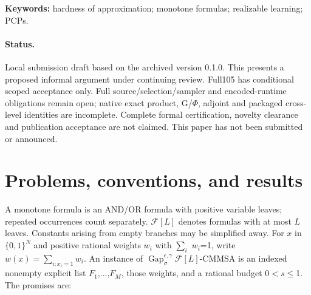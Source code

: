 \begin{abstract}
For every sufficiently large fixed leaf bound \(L\), we present a proposed randomized polynomial-time many-one NP-hardness of realizable Collection Minimum Monotone Satisfying Assignment with weight gap \(L^{1-o(1)}\) and NO satisfaction threshold \(o(1)\). The corresponding bounded-advice learning statement follows through Hirahara--Nanashima's transfer. The target is the \(\epsilon\)=0 strengthening asked in Section 7 of their June 23, 2026 revision. We combine their star-projection compilation with Minzer--Zheng's Grassmann PCP machinery, an altered repetition parameter order, explicit advice-posterior and zoom-out estimates, a maximal-extension threshold ladder, and finite-list completeness repair. Every leaf/advice bound is fixed independently of input length; the polynomial exponent may depend on it. The contribution is the nearlinear exponent in the realizable regime, with earlier realizable hardness explicitly credited below.

\end{abstract}
\noindent\textbf{Keywords:} hardness of approximation; monotone formulas; realizable learning; PCPs.
\paragraph{Status.} Local submission draft based on the archived version 0.1.0. This presents a proposed informal argument under continuing review. Full105 has conditional scoped acceptance only. Full source/selection/sampler and encoded-runtime obligations remain open; native exact product, G/\(\Phi\), adjoint and packaged cross-level identities are incomplete. Complete formal certification, novelty clearance and publication acceptance are not claimed. This paper has not been submitted or announced.
\section{Problems, conventions, and results}\label{sec:1}
A monotone formula is an AND/OR formula with positive variable leaves; repeated occurrences count separately. \(\mathcal F[L]\) denotes formulas with at most \(L\) leaves. Constants arising from empty branches may be simplified away. For \(x\) in \(\{0,1\}^N\) and positive rational weights \(w_i\) with \(\sum_i\) \(w_i\)=1, write \(w(x)=\sum_{i:x_i=1}w_i\). An instance of \(\operatorname{Gap}^{\epsilon,\gamma}_\sigma\mathcal F[L]\text{-CMMSA}\) is an indexed nonempty explicit list \(F_1\),...,\(F_M\), those weights, and a rational budget 0\(<\)\(s\)\(\le\)1. The promises are:

